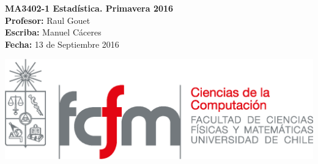 \documentclass[10pt]{article}
\theoremstyle{plain}
\theoremstyle{definition}
\newcommand{\fecha}{13 de Septiembre 2016 }
\begin{document}
\vspace*{-1.2 cm}
\begin{minipage}{0.6\textwidth}
\begin{flushleft}
\hspace*{-0.5cm}\textbf{MA3402-1 Estadística. Primavera 2016}\\
\hspace*{-0.5cm}\textbf{Profesor:} Raul Gouet\\
\hspace*{-0.5cm}\textbf{Escriba:} Manuel Cáceres\\
\hspace*{-0.5cm}\textbf{Fecha:} \fecha
\end{flushleft}
\end{minipage}
\begin{minipage}{0.36\textwidth}
\begin{flushright}
\includegraphics[scale=0.3]{imagenes/fcfm_dcc}
\end{flushright}
\end{minipage}
\bigskip
\end{document}
